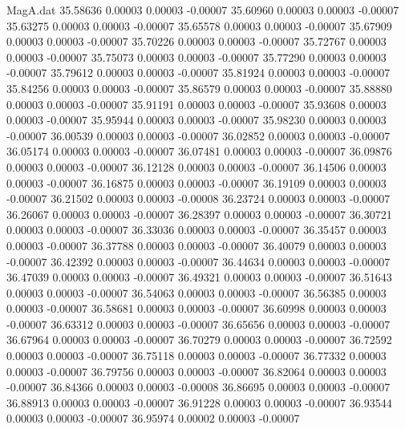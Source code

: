 \begin{filecontents}{MagA.dat}
  35.58636    0.00003    0.00003   -0.00007
  35.60960    0.00003    0.00003   -0.00007
  35.63275    0.00003    0.00003   -0.00007
  35.65578    0.00003    0.00003   -0.00007
  35.67909    0.00003    0.00003   -0.00007
  35.70226    0.00003    0.00003   -0.00007
  35.72767    0.00003    0.00003   -0.00007
  35.75073    0.00003    0.00003   -0.00007
  35.77290    0.00003    0.00003   -0.00007
  35.79612    0.00003    0.00003   -0.00007
  35.81924    0.00003    0.00003   -0.00007
  35.84256    0.00003    0.00003   -0.00007
  35.86579    0.00003    0.00003   -0.00007
  35.88880    0.00003    0.00003   -0.00007
  35.91191    0.00003    0.00003   -0.00007
  35.93608    0.00003    0.00003   -0.00007
  35.95944    0.00003    0.00003   -0.00007
  35.98230    0.00003    0.00003   -0.00007
  36.00539    0.00003    0.00003   -0.00007
  36.02852    0.00003    0.00003   -0.00007
  36.05174    0.00003    0.00003   -0.00007
  36.07481    0.00003    0.00003   -0.00007
  36.09876    0.00003    0.00003   -0.00007
  36.12128    0.00003    0.00003   -0.00007
  36.14506    0.00003    0.00003   -0.00007
  36.16875    0.00003    0.00003   -0.00007
  36.19109    0.00003    0.00003   -0.00007
  36.21502    0.00003    0.00003   -0.00008
  36.23724    0.00003    0.00003   -0.00007
  36.26067    0.00003    0.00003   -0.00007
  36.28397    0.00003    0.00003   -0.00007
  36.30721    0.00003    0.00003   -0.00007
  36.33036    0.00003    0.00003   -0.00007
  36.35457    0.00003    0.00003   -0.00007
  36.37788    0.00003    0.00003   -0.00007
  36.40079    0.00003    0.00003   -0.00007
  36.42392    0.00003    0.00003   -0.00007
  36.44634    0.00003    0.00003   -0.00007
  36.47039    0.00003    0.00003   -0.00007
  36.49321    0.00003    0.00003   -0.00007
  36.51643    0.00003    0.00003   -0.00007
  36.54063    0.00003    0.00003   -0.00007
  36.56385    0.00003    0.00003   -0.00007
  36.58681    0.00003    0.00003   -0.00007
  36.60998    0.00003    0.00003   -0.00007
  36.63312    0.00003    0.00003   -0.00007
  36.65656    0.00003    0.00003   -0.00007
  36.67964    0.00003    0.00003   -0.00007
  36.70279    0.00003    0.00003   -0.00007
  36.72592    0.00003    0.00003   -0.00007
  36.75118    0.00003    0.00003   -0.00007
  36.77332    0.00003    0.00003   -0.00007
  36.79756    0.00003    0.00003   -0.00007
  36.82064    0.00003    0.00003   -0.00007
  36.84366    0.00003    0.00003   -0.00008
  36.86695    0.00003    0.00003   -0.00007
  36.88913    0.00003    0.00003   -0.00007
  36.91228    0.00003    0.00003   -0.00007
  36.93544    0.00003    0.00003   -0.00007
  36.95974    0.00002    0.00003   -0.00007

\end{filecontents}
